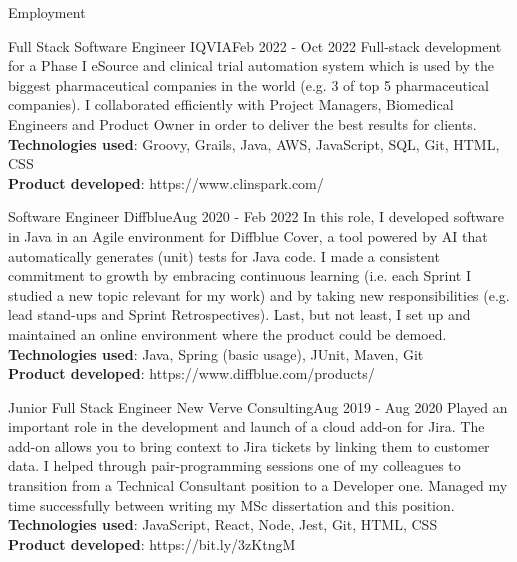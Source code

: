 \documentclass[]{mcdowellcv}
\begin{document}
\begin{cvsection}{Employment}
	    \begin{cvsubsection}{Full Stack Software Engineer }{IQVIA}{Feb 2022 - Oct 2022}
			\hspace{\parindent} \hspace{\parindent} \hspace{\parindent} \hspace{\parindent} Full-stack development for a Phase I eSource and clinical trial automation system which is used by the biggest pharmaceutical companies in the world (e.g. 3 of top 5 pharmaceutical companies). I collaborated efficiently with Project Managers, Biomedical Engineers and Product Owner in order to deliver the best results for clients. 
			\\ \textbf{Technologies used}: Groovy, Grails, Java, AWS, JavaScript, SQL, Git, HTML, CSS
			\\ \textbf{Product developed}: https://www.clinspark.com/
		\end{cvsubsection}

   	    \begin{cvsubsection}{Software Engineer }{Diffblue}{Aug 2020 - Feb 2022 }
			\hspace{\parindent} \hspace{\parindent} \hspace{\parindent} \hspace{\parindent} In this role, I developed software in Java in an Agile environment for Diffblue Cover, a tool powered by AI that automatically generates (unit) tests for Java code. I made a consistent commitment to growth by embracing continuous learning (i.e. each Sprint I studied a new topic relevant for my work) and by taking new responsibilities (e.g. lead stand-ups and Sprint Retrospectives). Last, but not least, I set up and maintained an online environment where the product could be demoed.
      		\\ \textbf{Technologies used}: Java, Spring (basic usage), JUnit, Maven, Git
	  		\\ \textbf{Product developed}: https://www.diffblue.com/products/
		\end{cvsubsection}

		\begin{cvsubsection}{Junior Full Stack Engineer }{New Verve Consulting}{Aug 2019 - Aug 2020} 
			\hspace{\parindent} \hspace{\parindent} \hspace{\parindent} \hspace{\parindent} Played an important role in the development and launch of a cloud add-on for Jira. The add-on allows you to bring context to Jira tickets by linking them to customer data. I helped through pair-programming sessions one of my colleagues to transition from a Technical Consultant position to a Developer one. Managed my time successfully between writing my MSc dissertation and this position.
      		\\ \textbf{Technologies used}: JavaScript, React, Node, Jest, Git, HTML, CSS
	  		\\ \textbf{Product developed}: https://bit.ly/3zKtngM
		\end{cvsubsection}



\end{cvsection}
\end{document}
